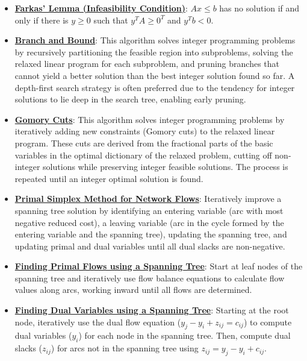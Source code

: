 \documentclass{article}%
\begin{document}
\begin{itemize}[leftmargin=*]
\item \href{https://www.math.purdue.edu/~yipn/421/2024-10-28-Farkas.pdf#page=6}{\textbf{Farkas' Lemma (Infeasibility Condition)}}: $Ax \le b$ has no solution if and only if there is $y \ge 0$ such that $y^T A \ge 0^T$ and $y^T b < 0$.%
\item \href{https://www.math.purdue.edu/~yipn/421/2024-10-31-IntLinProg.pdf#page=5}{\textbf{Branch and Bound}}: This algorithm solves integer programming problems by recursively partitioning the feasible region into subproblems, solving the relaxed linear program for each subproblem, and pruning branches that cannot yield a better solution than the best integer solution found so far. A depth-first search strategy is often preferred due to the tendency for integer solutions to lie deep in the search tree, enabling early pruning. %
\item \href{https://www.math.purdue.edu/~yipn/421/2024-10-31-IntLinProg.pdf#page=15}{\textbf{Gomory Cuts}}: This algorithm solves integer programming problems by iteratively adding new constraints (Gomory cuts) to the relaxed linear program. These cuts are derived from the fractional parts of the basic variables in the optimal dictionary of the relaxed problem, cutting off non-integer solutions while preserving integer feasible solutions. The process is repeated until an integer optimal solution is found. %
\item \href{https://www.math.purdue.edu/~yipn/421/2024-11-05-NetFlows.pdf#page=22}{\textbf{Primal Simplex Method for Network Flows}}: Iteratively improve a spanning tree solution by identifying an entering variable (arc with most negative reduced cost), a leaving variable (arc in the cycle formed by the entering variable and the spanning tree), updating the spanning tree, and updating primal and dual variables until all dual slacks are non-negative.%
\item \href{https://www.math.purdue.edu/~yipn/421/2024-11-05-NetFlows.pdf#page=14}{\textbf{Finding Primal Flows using a Spanning Tree}}: Start at leaf nodes of the spanning tree and iteratively use flow balance equations to calculate flow values along arcs, working inward until all flows are determined.%
\item \href{https://www.math.purdue.edu/~yipn/421/2024-11-05-NetFlows.pdf#page=19}{\textbf{Finding Dual Variables using a Spanning Tree}}: Starting at the root node, iteratively use the dual flow equation ($y_j - y_i + z_{ij} = c_{ij}$) to compute dual variables ($y_i$) for each node in the spanning tree. Then, compute dual slacks ($z_{ij}$) for arcs not in the spanning tree using $z_{ij} = y_j - y_i + c_{ij}$.%

\end{itemize}
\end{document}
